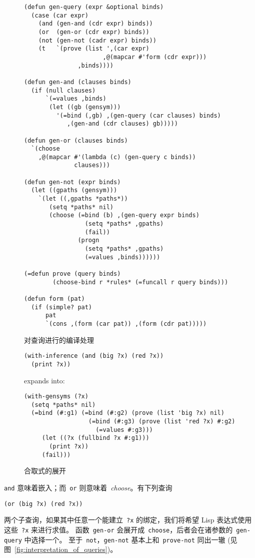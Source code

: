 \begin{figure}
\begin{lstlisting}
(defun gen-query (expr &optional binds)
  (case (car expr)
    (and (gen-and (cdr expr) binds))
    (or  (gen-or (cdr expr) binds))
    (not (gen-not (cadr expr) binds))
    (t   `(prove (list ',(car expr)
                      ,@(mapcar #'form (cdr expr)))
               ,binds))))

(defun gen-and (clauses binds)
  (if (null clauses)
      `(=values ,binds)
       (let ((gb (gensym)))
         '(=bind (,gb) ,(gen-query (car clauses) binds)
            ,(gen-and (cdr clauses) gb)))))

(defun gen-or (clauses binds)
  `(choose
    ,@(mapcar #'(lambda (c) (gen-query c binds))
              clauses)))

(defun gen-not (expr binds)
  (let ((gpaths (gensym)))
    `(let ((,gpaths *paths*))
       (setq *paths* nil)
       (choose (=bind (b) ,(gen-query expr binds)
                 (setq *paths* ,gpaths)
                 (fail))
               (progn
                 (setq *paths* ,gpaths)
                 (=values ,binds))))))

(=defun prove (query binds)
        (choose-bind r *rules* (=funcall r query binds)))

(defun form (pat)
  (if (simple? pat)
      pat
      `(cons ,(form (car pat)) ,(form (cdr pat)))))
\end{lstlisting}
\caption{对查询进行的编译处理}
\label{fig:compilation_of_queries}
\end{figure}

\begin{figure}
\begin{lstlisting}
(with-inference (and (big ?x) (red ?x))
  (print ?x))
\end{lstlisting}
  expands into:
\begin{lstlisting}
(with-gensyms (?x)
  (setq *paths* nil)
  (=bind (#:g1) (=bind (#:g2) (prove (list 'big ?x) nil)
                  (=bind (#:g3) (prove (list 'red ?x) #:g2)
                    (=values #:g3)))
     (let ((?x (fullbind ?x #:g1)))
       (print ?x))
     (fail)))
\end{lstlisting}
\caption{合取式的展开}
\label{fig:expansion_of_a_conjunction}
\end{figure}

\verb|and| 意味着嵌入；而~\verb|or| 则意味着~\emph{choose}。有下列查询
\begin{lstlisting}
(or (big ?x) (red ?x))
\end{lstlisting}
两个子查询，如果其中任意一个能建立~\verb|?x| 的绑定，我们将希望 Lisp 表达式使用这些~\verb|?x| 来进行求值。
函数~\verb|gen-or| 会展开成~\verb|choose|，后者会在诸参数的~\verb|gen-query| 中选择一个。
至于~\verb|not|，\verb|gen-not| 基本上和~\verb|prove-not| 同出一辙 (见图~\ref{fig:interpretation_of_queries})。

